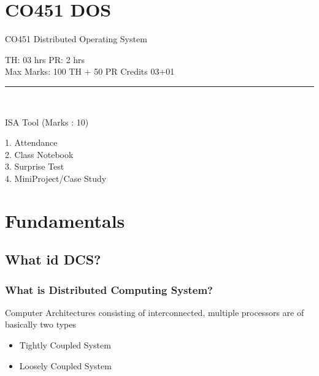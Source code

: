 \documentclass{beamer}
\begin{document}
   


\section{CO451 DOS}
\begin{frame}
\begin{center}
\huge CO451 Distributed Operating System\\
\end{center}
TH: 03 hrs
\hspace{5cm}
PR: 2 hrs\\
Max Marks: 100 TH + 50 PR
\hspace{2cm}
Credits 03+01\\
\noindent\rule{10.5cm}{0.4pt}\\
\begin{center}
ISA Tool (Marks : 10)\\
\end{center}
\hspace{2cm}1. Attendance\\
\hspace{2cm}2. Class Notebook\\
\hspace{2cm}3. Surprise Test\\
\hspace{2cm}4. MiniProject/Case Study\\
\vspace{2cm}
\end{frame} 



\section{Fundamentals}
\subsection{What id DCS?}
    \begin{frame}
        \frametitle{What is Distributed Computing System?}
            Computer Architectures consisting of interconnected, multiple processors are of basically two types
        \vspace{0.02cm}
        \begin{itemize}
        	\item Tightly Coupled System
            \item Loosely Coupled System
        \end{itemize}
        \vspace{5cm}
    \end{frame}
\end{document}
